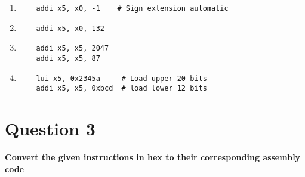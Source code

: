 \begin{enumerate}
    \item {}
    \begin{lstlisting}
    addi x5, x0, -1    # Sign extension automatic
    \end{lstlisting}
    \item {}
    \begin{lstlisting}
    addi x5, x0, 132
    \end{lstlisting}
    \item {}
    \begin{lstlisting}
    addi x5, x5, 2047
    addi x5, x5, 87
    \end{lstlisting}
    \item {}
    \begin{lstlisting}
    lui x5, 0x2345a     # Load upper 20 bits
    addi x5, x5, 0xbcd  # load lower 12 bits
    \end{lstlisting}
\end{enumerate}

\section{Question 3}
\textbf{Convert the given instructions in hex to their corresponding assembly code}

